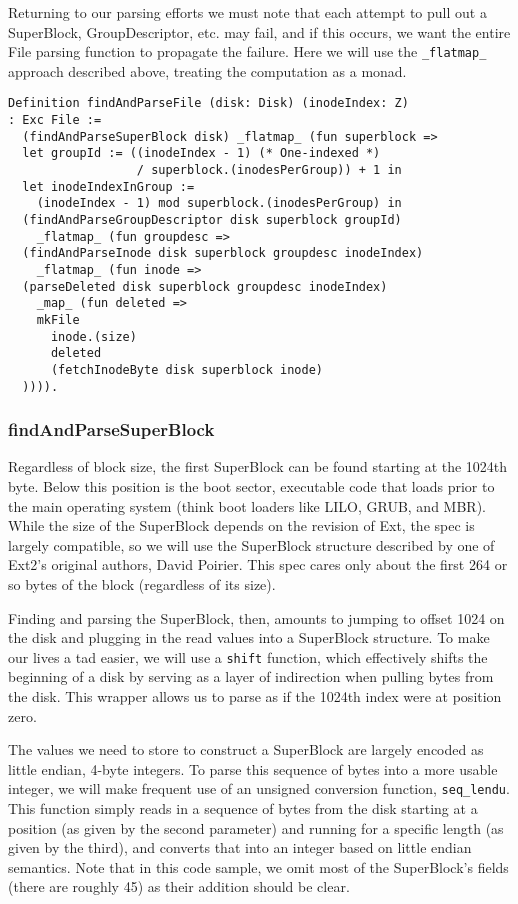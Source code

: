 \documentclass[nocopyrightspace]{sigplanconf}
\begin{document}
Returning to our parsing efforts we must note that each attempt to pull out a
SuperBlock, GroupDescriptor, etc. may fail, and if this occurs, we want the
entire File parsing function to propagate the failure. Here we will use the
{\tt \_flatmap\_} approach described above, treating the computation as a
monad.

\begin{lstlisting}
Definition findAndParseFile (disk: Disk) (inodeIndex: Z) 
: Exc File :=
  (findAndParseSuperBlock disk) _flatmap_ (fun superblock =>
  let groupId := ((inodeIndex - 1) (* One-indexed *)
                  / superblock.(inodesPerGroup)) + 1 in
  let inodeIndexInGroup := 
    (inodeIndex - 1) mod superblock.(inodesPerGroup) in
  (findAndParseGroupDescriptor disk superblock groupId) 
    _flatmap_ (fun groupdesc =>
  (findAndParseInode disk superblock groupdesc inodeIndex) 
    _flatmap_ (fun inode =>
  (parseDeleted disk superblock groupdesc inodeIndex) 
    _map_ (fun deleted =>
    mkFile
      inode.(size)
      deleted
      (fetchInodeByte disk superblock inode)
  )))).
\end{lstlisting}

\subsubsection{findAndParseSuperBlock}

Regardless of block size, the first SuperBlock can be found starting at the
1024th byte. Below this position is the boot sector, executable code that
loads prior to the main operating system (think boot loaders like LILO, GRUB,
and MBR). While the size of the SuperBlock depends on the revision of Ext, the
spec is largely compatible, so we will use the SuperBlock structure described
by one of Ext2's original authors, David Poirier\cite{non-gnu}. This spec
cares only about the first 264 or so bytes of the block (regardless of its
size).

Finding and parsing the SuperBlock, then, amounts to jumping to offset 1024 on
the disk and plugging in the read values into a SuperBlock structure. To make
our lives a tad easier, we will use a {\tt shift} function, which effectively
shifts the beginning of a disk by serving as a layer of indirection when
pulling bytes from the disk. This wrapper allows us to parse as if the 1024th
index were at position zero.

The values we need to store to construct a SuperBlock are largely encoded as
little endian, 4-byte integers. To parse this sequence of bytes into a more
usable integer, we will make frequent use of an unsigned conversion function,
{\tt seq\_lendu}. This function simply reads in a sequence of bytes from the
disk starting at a position (as given by the second parameter) and running for
a specific length (as given by the third), and converts that into an integer
based on little endian semantics. Note that in this code sample, we omit most
of the SuperBlock's fields (there are roughly 45) as their addition should be
clear.
\end{document}
